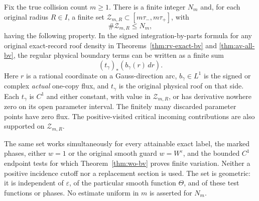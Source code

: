 
\begin{lemma}
\label{lem:sbv-geometric-sides}
Fix the true collision count $m\ge1$. There is a finite integer $N_m$
and, for each original radius $R\in I$, a finite set
$\mathcal Z_{m,R}\subset[m\tau_-,m\tau_+]$, with
\[
                         \#\mathcal Z_{m,R}\le N_m,
\]
having the following property. In the signed integration-by-parts
formula for any original exact-record roof density in
Theorems~\ref{thm:rv-exact-bv} and \ref{thm:av-all-bv}, the regular
physical boundary terms can be written as a finite sum
\[
       (t_\gamma)_*(b_\gamma(r)\,dr).
\]
Here $r$ is a rational coordinate on a Gauss-direction arc,
$b_\gamma\in L^1$ is the signed or complex \emph{actual} one-copy
flux, and $t_\gamma$ is the original physical roof on that side.
Each $t_\gamma$ is $C^1$ and either constant, with value in
$\mathcal Z_{m,R}$, or has derivative nowhere zero on its open
parameter interval. The finitely many discarded parameter points
have zero flux. The positive-visited critical incoming contributions
are also supported on $\mathcal Z_{m,R}$.

The same set works simultaneously for every attainable exact label,
the marked phases, either $w=1$ or the original smooth guard
$w=W^\varepsilon$, and the bounded $C^1$ endpoint tests for which
Theorem~\ref{thm:wo-bv} proves finite variation. Neither a positive
incidence cutoff nor a replacement section is used. The set is
geometric: it is independent of $\varepsilon$, of the particular
smooth function $\Theta$, and of these test functions or phases.
No estimate uniform in $m$ is asserted for $N_m$.
\end{lemma}

